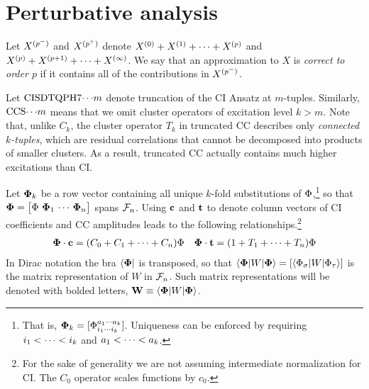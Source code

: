 \documentclass[11pt]{article}
\numberwithin{equation}{section}
\begin{document}
\setlength{\abovedisplayskip}{3pt}
\setlength{\belowdisplayskip}{3pt}



\setcounter{section}{6}
\section{Perturbative analysis}


\begin{dfn}
Let
$
  X^{(p^-)}
$
and
$
  X^{(p^+)}
$
denote
$
  X^{(0)}
+
  X^{(1)}
+
  \cdots
+
  X^{(p)}
$
and
$
  X^{(p)}
+
  X^{(p+1)}
+
  \cdots
+
  X^{(\infty)}
$.
We say that an approximation to $X$ is \textit{correct to order $p$} if it contains all of the contributions in $X^{(p^-)}$.
\end{dfn}

\begin{dfn}
Let $\mathrm{CISDTQPH7}{\cdots}m$ denote truncation of the CI Ansatz at $m$-tuples.
Similarly, $\mathrm{CCS}{\cdots}m$ means that we omit cluster operators of excitation level $k>m$.
Note that, unlike $C_k$, the cluster operator $T_k$ in truncated CC describes only \textit{connected $k$-tuples}, which are residual correlations that cannot be decomposed into products of smaller clusters.
As a result, truncated CC actually contains much higher excitations than CI.
\end{dfn}

\begin{ntt}
Let
$\bm{\F}_k$
be a row vector containing all unique $k$-fold substitutions of $\Phi $,\footnote{That is, $\bm{\F}_k=[\F_{i_1\cd i_k}^{a_1\cd a_k}]$.
Uniqueness can be enforced by requiring $i_1<\cdots<i_k$ and $a_1<\cdots<a_k$.}
so that $\bm{\F}=\pma{\F\ \bm{\F}_1\,\cd\,\bm{\F}_n}$ spans $\mathcal{F}_n$.
Using $\mathbf{c}$ and $\mathbf{t}$ to denote column vectors of CI coefficients and CC amplitudes leads to the following relationships.\footnote{For the sake of generality we are not assuming intermediate normalization for CI.  The $C_0$ operator scales functions by $c_0$.}
\begin{align}
  \mathbf{\Phi }\cdot\mathbf{c}
=
  (C_0 + C_1+\cdots +C_n)\Phi 
&&
  \mathbf{\Phi }\cdot\mathbf{t}
=
  (1 + T_1+\cdots +T_n)\Phi 
\end{align}
In Dirac notation the bra $\langle\mathbf{\Phi }|$ is transposed, so that
$
  \ip{\bm{\F}|W|\bm{\F}}
=
  [\ip{\F_\si|W|\F_\ta}]
$
is the matrix representation of $W$ in $\mathcal{F}_n$.
Such matrix representations will be denoted with bolded letters,
$
  \bo{W}
\equiv
  \ip{\bm{\F}|W|\bm{\F}}
$.
\end{ntt}
\end{document}
